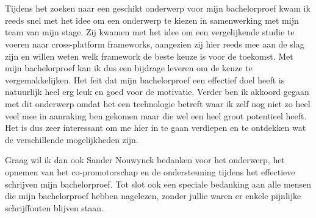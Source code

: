 
\chapter*{}
\label{ch:voorwoord}


Tijdens het zoeken naar een geschikt onderwerp voor mijn bachelorproef kwam ik reeds snel met het idee om een onderwerp te kiezen in samenwerking met mijn team van mijn stage. Zij kwamen met het idee om een vergelijkende studie te voeren naar cross-platform frameworks, aangezien zij hier reeds mee aan de slag zijn en willen weten welk framework de beste keuze is voor de toekomst. Met mijn bachelorproef kan ik dus een bijdrage leveren om de keuze te vergemakkelijken. Het feit dat mijn bachelorproef een effectief doel heeft is natuurlijk heel erg leuk en goed voor de motivatie. Verder ben ik akkoord gegaan met dit onderwerp omdat het een technologie betreft waar ik zelf nog niet zo heel veel mee in aanraking ben gekomen maar die wel een heel groot potentieel heeft. Het is dus zeer interessant om me hier in te gaan verdiepen en te ontdekken wat de verschillende mogelijkheden zijn.

Graag wil ik dan ook Sander Nouwynck bedanken voor het onderwerp, het opnemen van het co-promotorschap en de ondersteuning tijdens het effectieve schrijven mijn bachelorproef. Tot slot ook een speciale bedanking aan alle mensen die mijn bachelorproef hebben nagelezen, zonder jullie waren er enkele pijnlijke schrijffouten blijven staan.